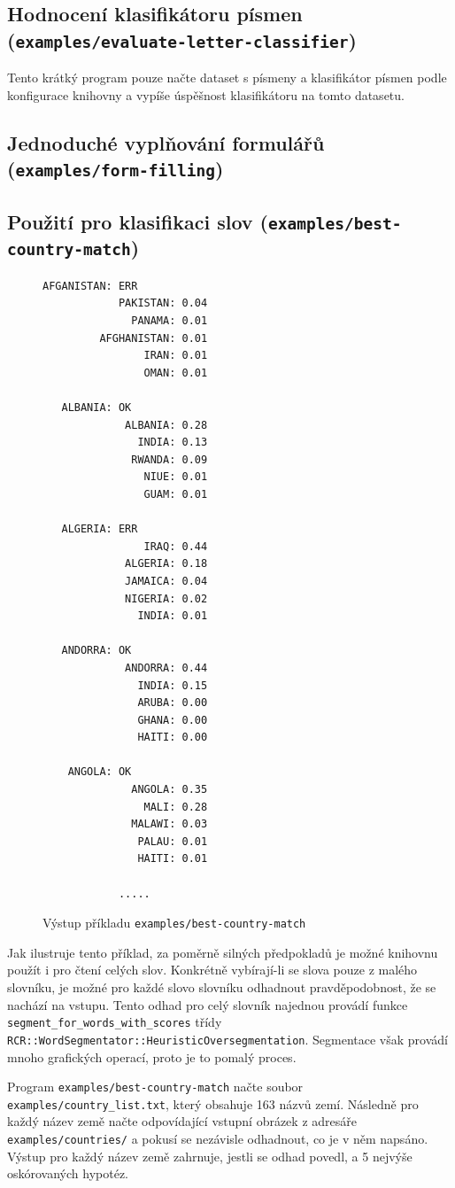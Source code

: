 \documentclass[a4paper]{article}
\begin{document}
\subsection{Hodnocení klasifikátoru písmen (\texttt{examples/evaluate-letter-classifier})}
Tento krátký program pouze načte dataset s písmeny a klasifikátor písmen podle
konfigurace knihovny a vypíše úspěšnost klasifikátoru na tomto datasetu.

\subsection{Jednoduché vyplňování formulářů (\texttt{examples/form-filling})}

\subsection{Použití pro klasifikaci slov (\texttt{examples/best-country-match})}
\begin{figure}
\begin{lstlisting}
AFGANISTAN: ERR
            PAKISTAN: 0.04
              PANAMA: 0.01
         AFGHANISTAN: 0.01
                IRAN: 0.01
                OMAN: 0.01

   ALBANIA: OK
             ALBANIA: 0.28
               INDIA: 0.13
              RWANDA: 0.09
                NIUE: 0.01
                GUAM: 0.01

   ALGERIA: ERR
                IRAQ: 0.44
             ALGERIA: 0.18
             JAMAICA: 0.04
             NIGERIA: 0.02
               INDIA: 0.01

   ANDORRA: OK
             ANDORRA: 0.44
               INDIA: 0.15
               ARUBA: 0.00
               GHANA: 0.00
               HAITI: 0.00

    ANGOLA: OK
              ANGOLA: 0.35
                MALI: 0.28
              MALAWI: 0.03
               PALAU: 0.01
               HAITI: 0.01

            .....
\end{lstlisting}
\caption{Výstup příkladu \texttt{examples/best-country-match}}
\end{figure}

Jak ilustruje tento příklad, za poměrně silných předpokladů je možné knihovnu
použít i pro čtení celých slov. Konkrétně vybírají-li se slova pouze z
malého slovníku, je možné pro každé slovo slovníku odhadnout pravděpodobnost,
že se nachází na vstupu. Tento odhad pro celý slovník najednou provádí funkce
\texttt{segment\_for\_words\_with\_scores} třídy
\texttt{RCR::WordSegmentator::HeuristicOversegmentation}.
Segmentace však provádí mnoho grafických operací, proto je to pomalý proces.

Program \texttt{examples/best-country-match} načte soubor
\texttt{examples/country\_list.txt}, který obsahuje 163 názvů zemí.
Následně pro každý název země načte odpovídající vstupní obrázek z adresáře
\texttt{examples/countries/} a pokusí se nezávisle odhadnout, co je v něm
napsáno. Výstup pro každý název země zahrnuje, jestli se odhad povedl, a
5 nejvýše oskórovaných hypotéz.



\end{document}
